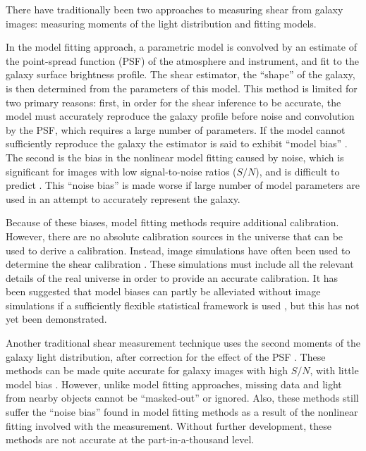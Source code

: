 \documentclass[iop, twocolappendix, appendixfloats, numberedappendix, apj]{emulateapj}
\newcommand{\snr}{$S/N$}
\begin{document}
There have traditionally been two approaches to measuring shear from
galaxy images: measuring moments of the light distribution and fitting models.

In the model fitting approach, a parametric model is convolved by an estimate
of the point-spread function (PSF) of the atmosphere and instrument, and fit to
the galaxy surface brightness profile.  The shear estimator, the ``shape'' of
the galaxy, is then determined from the parameters of this model.  This method
is limited for two primary reasons: first, in order for the shear inference to
be accurate, the model must accurately reproduce the galaxy profile before
noise and convolution by the PSF, which requires a large number of parameters.
If the model cannot sufficiently reproduce the galaxy the estimator is said to
exhibit ``model bias'' \citep{Bernstein2010}.  The second is the bias in the
nonlinear model fitting caused by noise, which is significant for images with low
signal-to-noise ratios (\snr), and is difficult to predict
\citep{HirataAlign04,Refreg12,Melchior12}.  This ``noise bias'' is made worse
if large number of model parameters are used in an attempt to accurately
represent the galaxy.

Because of these biases, model fitting methods require additional
calibration.  However, there are no absolute calibration sources in the
universe that can be used to derive a calibration.  Instead, image
simulations have often been used to determine the shear calibration
\citep[e.g.][]{Zuntz13,Miller13,KidsShear2017,Refregier13,Jee16}.  These
simulations must include all the relevant details of the real universe in order
to provide an accurate calibration.  It has been suggested that model biases
can partly be alleviated without image simulations if a sufficiently flexible
statistical framework is used \citep{SchneiderProbshear2015}, but this has not
yet been demonstrated.

Another traditional shear measurement technique uses the second moments of the
galaxy light distribution, after correction for the effect of the PSF
\citep[e.g.][]{ksb95,Bernstein2010}.  These methods can be made quite accurate
for galaxy images with high \snr, with little model bias
\citep{Bernstein2010,Okura2016}.  However, unlike model fitting approaches,
missing data and light from nearby objects cannot be ``masked-out'' or ignored.
Also, these methods still suffer the ``noise bias'' found in model fitting
methods as a result of the nonlinear fitting involved with the measurement.
Without further development, these methods are not accurate at the
part-in-a-thousand level.
\end{document}
